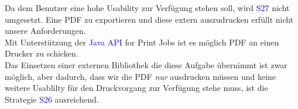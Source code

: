 \documentclass[enabledeprecatedfontcommands,fontsize=11pt,paper=a4,twoside]{scrartcl}
\newcounter{one}
\newcommand{\cb}[1]{{\textcolor{blue}{#1}}}
\begin{document}
\begin{onehalfspace}
	Da dem Benutzer eine hohe Usability zur Verfügung stehen soll, wird \cb{S27} nicht umgesetzt. Eine PDF zu exportieren und diese extern auszudrucken erfüllt nicht unsere Anforderungen. \\
	Mit Unterstützung der \cb{Java API} for Print Jobs ist es möglich PDF an einen Drucker zu schicken. \\
	Das Einsetzen einer externen Bibliothek die diese Aufgabe übernimmt ist zwar möglich, aber dadurch, dass wir die PDF \textit{nur} ausdrucken müssen und keine weitere Usablilty für den Druckvorgang zur Verfügung stehe muss, ist die Strategie \cb{S26} ausreichend.
\end{onehalfspace}
\newpage
\hspace{-0.65cm}
\end{document}

